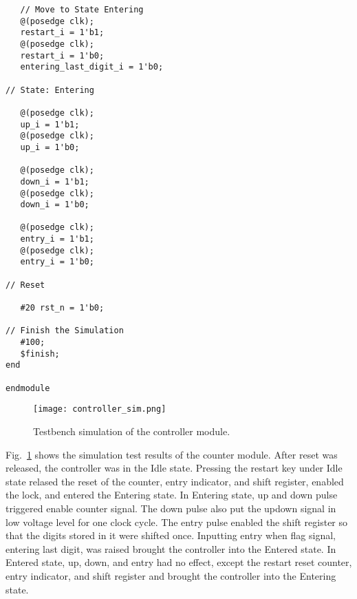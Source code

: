 \begin{verbatim}
   // Move to State Entering
   @(posedge clk);
   restart_i = 1'b1;
   @(posedge clk);
   restart_i = 1'b0;
   entering_last_digit_i = 1'b0;

// State: Entering

   @(posedge clk);
   up_i = 1'b1;
   @(posedge clk);
   up_i = 1'b0;

   @(posedge clk);
   down_i = 1'b1;
   @(posedge clk);
   down_i = 1'b0;

   @(posedge clk);
   entry_i = 1'b1;
   @(posedge clk);
   entry_i = 1'b0;

// Reset

   #20 rst_n = 1'b0;

// Finish the Simulation
   #100;
   $finish;
end

endmodule
\end{verbatim}

\begin{figure}[htbp]
   \centering
   \texttt{[image: controller\_sim.png]}
   \caption{Testbench simulation of the controller module.}
   \label{fig:controller_sim}
\end{figure}

Fig.~\ref{fig:controller_sim} shows the simulation test results of the counter module. After reset was released, the controller was in the Idle state. Pressing the restart key under Idle state relased the reset of the counter, entry indicator, and shift register, enabled the lock, and entered the Entering state. In Entering state, up and down pulse triggered enable counter signal. The down pulse also put the updown signal in low voltage level for one clock cycle. The entry pulse enabled the shift register so that the digits stored in it were shifted once. Inputting entry when flag signal, entering last digit, was raised brought the controller into the Entered state. In Entered state, up, down, and entry had no effect, except the restart reset counter, entry indicator, and shift register and brought the controller into the Entering state.
